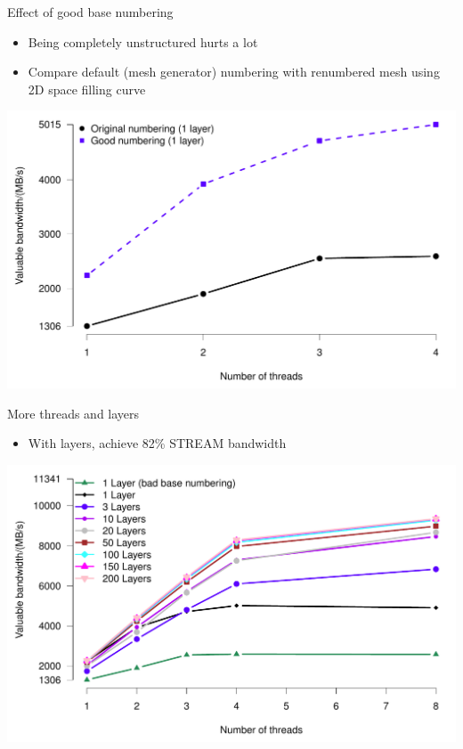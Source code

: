 \documentclass[bigger]{beamer}
\begin{document}
\begin{frame}[label={sec:orgheadline20}]{Effect of good base numbering}
\begin{itemize}
\item Being completely unstructured hurts a lot
\item Compare default (mesh generator) numbering with renumbered mesh
using 2D space filling curve
\end{itemize}
\begin{center}
\includegraphics[height=0.8\textheight]{03-12-PRISM-firedrake-overview.figures/bad-numbering}
\end{center}
\end{frame}

\begin{frame}[label={sec:orgheadline21}]{More threads and layers}
\begin{itemize}
\item With layers, achieve 82\% STREAM bandwidth
\end{itemize}
\begin{center}
\includegraphics[height=0.8\textheight]{03-12-PRISM-firedrake-overview.figures/valuable-bandwidth-by-thread}
\end{center}
\end{frame}
\end{document}
